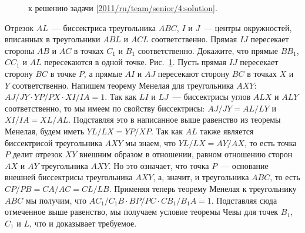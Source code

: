 \ifsolution
\begin{figure}\centering
    \caption{к решению задачи \ref{2011/ru/team/senior/4:solution}.}
    \label{2011/ru/team/senior/4:solution:fig}
\end{figure}%
\fi %

\problem{}
Отрезок $AL$~--- биссектриса треугольника $ABC$, $I$ и $J$~--- центры
окружностей, вписанных в треугольники $ABL$ и $ACL$ соответственно.
Прямая $IJ$ пересекает стороны $AB$ и $AC$ в точках $C_1$ и $B_1$
соответственно.
Докажите, что прямые $B B_1$, $C C_1$ и $AL$ пересекаются в одной точке.
\solution
\label{2011/ru/team/senior/4:solution}%
Рис.~\ref{2011/ru/team/senior/4:solution:fig}.
Пусть прямая $IJ$ пересекает сторону $BC$ в точке $P$, а прямые $AI$ и $AJ$
пересекают сторону $BC$ в точках $X$ и $Y$ соответственно.
Напишем теорему Менелая для треугольника $AXY$:
\(
    AJ / JY
    \cdot
    YP / PX
    \cdot
    XI / IA
=
    1
\).
Так как $LI$ и $LJ$~--- биссектрисы углов $ALX$ и $ALY$ соответственно, то мы
имеем по свойству биссектрисы:
$AJ / JY = AL / LY$ и $XI / IA = XL / AL$.
Подставляя это в написанное выше равенство из теоремы Менелая, будем иметь
$YL / LX = YP / XP$.
Так как $AL$ также является биссектрисой треугольника $AXY$ мы знаем, что
$YL / LX = AY / AX$, то есть точка $P$ делит отрезок $XY$ внешним
образом в отношении, равном отношению сторон $AX$ и $AY$ треугольника $AXY$.
Но это означает, что точка $P$~--- основание внешней биссектрисы треугольника
$AXY$, а, значит, и треугольника $ABC$, то есть
$CP / PB = CA / AC = CL / LB$.
Применяя теперь теорему Менелая к треугольнику $ABC$ мы получим, что
\(
    A C_1 / C_1 B
    \cdot
    BP / PC
    \cdot
    C B_1 / B_1 A
=
    1
\).
Подставляя сюда отмеченное выше равенство, мы получаем условие теоремы Чевы для
точек $B_1$, $C_1$ и $L$, что и доказывает требуемое.
\endproblem
